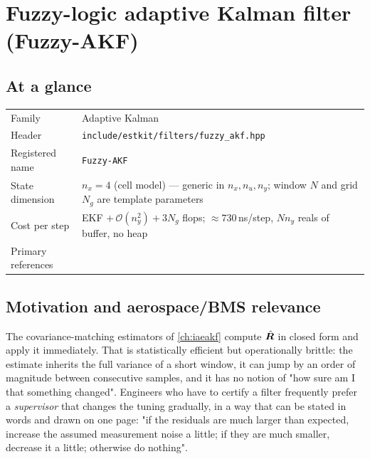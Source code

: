 \chapter{Fuzzy-logic adaptive Kalman filter (Fuzzy-AKF)}
\label{ch:fuzzyakf}

\section*{At a glance}
\begin{tabular}{@{}l>{\raggedright\arraybackslash}p{}@{}}
Family & Adaptive Kalman \\
Header & \texttt{include/estkit/filters/fuzzy\_akf.hpp} \\
Registered name & \texttt{Fuzzy-AKF} \\
State dimension & $n_x = 4$ (cell model) --- generic in $n_x, n_u, n_y$; window $N$ and grid $N_g$ are template parameters \\
Cost per step & EKF $+\,\mathcal{O}(n_y^2) + 3N_g$ flops; $\approx 730$\,ns/step, $N n_y$ reals of buffer, no heap \\
Primary references & \cite{loebis2004fuzzy,mamdani1975,zadeh1965,mohamed1999adaptive,jwo2007fuzzy} \\
\end{tabular}

\section{Motivation and aerospace/BMS relevance}
The covariance-matching estimators of \cref{ch:iaeakf} compute $\hat{\bm{R}}$ in closed form and apply
it immediately.  That is statistically efficient but operationally brittle: the estimate inherits
the full variance of a short window, it can jump by an order of magnitude between consecutive
samples, and it has no notion of "how sure am I that something changed".  Engineers who have to
certify a filter frequently prefer a \emph{supervisor} that changes the tuning gradually, in a way
that can be stated in words and drawn on one page: "if the residuals are much larger than expected,
increase the assumed measurement noise a little; if they are much smaller, decrease it a little;
otherwise do nothing".

